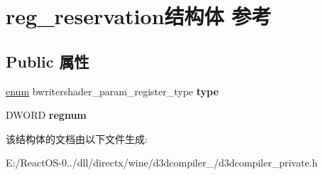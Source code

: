 \hypertarget{structreg__reservation}{}\section{reg\+\_\+reservation结构体 参考}
\label{structreg__reservation}
\subsection*{Public 属性}
\begin{DoxyCompactItemize}
\item 
\mbox{\label{structreg__reservation_ade613f11f096cd739029f1b51b4df18f}} 
\hyperlink{interfaceenum}{enum} bwritershader\+\_\+param\+\_\+register\+\_\+type {\bfseries type}
\item 
\mbox{\label{structreg__reservation_adce2735c641ff6e542d0ac81c9eb4751}} 
D\+W\+O\+RD {\bfseries regnum}
\end{DoxyCompactItemize}


该结构体的文档由以下文件生成\+:\begin{DoxyCompactItemize}
\item 
E\+:/\+React\+O\+S-\/0../dll/directx/wine/d3dcompiler\+\_/d3dcompiler\+\_\+private.\+h\end{DoxyCompactItemize}
